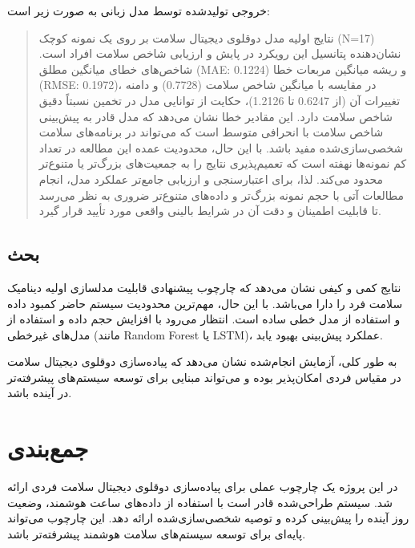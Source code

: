 \documentclass[12pt,a4paper]{article}
\begin{document}
خروجی تولیدشده توسط مدل زبانی به صورت زیر است:

\begin{quote}
	نتایج اولیه مدل دوقلوی دیجیتال سلامت بر روی یک نمونه کوچک (N=17) نشان‌دهنده پتانسیل این رویکرد در پایش و ارزیابی شاخص سلامت افراد است. شاخص‌های خطای میانگین مطلق (MAE: 0.1224) و ریشه میانگین مربعات خطا (RMSE: 0.1972)، در مقایسه با میانگین شاخص سلامت (0.7728) و دامنه تغییرات آن (از 0.6247 تا 1.2126)، حکایت از توانایی مدل در تخمین نسبتاً دقیق شاخص سلامت دارد. این مقادیر خطا نشان می‌دهد که مدل قادر به پیش‌بینی شاخص سلامت با انحرافی متوسط است که می‌تواند در برنامه‌های سلامت شخصی‌سازی‌شده مفید باشد. با این حال، محدودیت عمده این مطالعه در تعداد کم نمونه‌ها نهفته است که تعمیم‌پذیری نتایج را به جمعیت‌های بزرگ‌تر یا متنوع‌تر محدود می‌کند. لذا، برای اعتبارسنجی و ارزیابی جامع‌تر عملکرد مدل، انجام مطالعات آتی با حجم نمونه بزرگ‌تر و داده‌های متنوع‌تر ضروری به نظر می‌رسد تا قابلیت اطمینان و دقت آن در شرایط بالینی واقعی مورد تأیید قرار گیرد.
\end{quote}

\subsection{بحث}

نتایج کمی و کیفی نشان می‌دهد که چارچوب پیشنهادی قابلیت مدلسازی اولیه دینامیک سلامت فرد را دارا می‌باشد. با این حال، مهم‌ترین محدودیت سیستم حاضر کمبود داده و استفاده از مدل خطی ساده است. انتظار می‌رود با افزایش حجم داده و استفاده از مدل‌های غیرخطی (مانند Random Forest یا LSTM)، عملکرد پیش‌بینی بهبود یابد.

به طور کلی، آزمایش انجام‌شده نشان می‌دهد که پیاده‌سازی دوقلوی دیجیتال سلامت در مقیاس فردی امکان‌پذیر بوده و می‌تواند مبنایی برای توسعه سیستم‌های پیشرفته‌تر در آینده باشد.


	
	
	
	\section{جمع‌بندی}
	
	در این پروژه یک چارچوب عملی برای پیاده‌سازی دوقلوی دیجیتال سلامت فردی ارائه شد. سیستم طراحی‌شده قادر است با استفاده از داده‌های ساعت هوشمند، وضعیت روز آینده را پیش‌بینی کرده و توصیه شخصی‌سازی‌شده ارائه دهد. این چارچوب می‌تواند پایه‌ای برای توسعه سیستم‌های سلامت هوشمند پیشرفته‌تر باشد.
	
\end{document}
